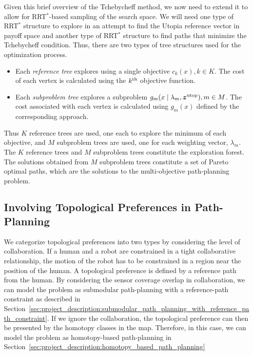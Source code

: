 \documentclass[phd]{byuprop}
\begin{document}
Given this brief overview of the Tchebycheff method, we now need to extend it to allow for RRT$^{*}$-based sampling of the search space.  
We will need one type of RRT$^{*}$ structure to explore in an attempt to find the Utopia reference vector in payoff space and another type of RRT$^{*}$ structure to find paths that minimize the Tchebycheff condition. %
Thus, there are two types of tree structures used for the optimization process.
\begin{itemize}
	\item Each \emph{reference tree} explores using a single objective $ c_{k} (x), k \in K $. 
	The cost of each vertex is calculated using the $ k^{\rm th} $ objective function.
	\item Each \emph{subproblem tree} explores a subproblem $ g_{m} ( x \mid \lambda_{m} , \bm{z}^{\rm utop} ) , m \in M $.
	The cost associated with each vertex is calculated using $ g_{m}(x) $ defined by the corresponding approach.
\end{itemize}
Thus $ K $ reference trees are used, one each to explore the minimum of each objective, and $ M $ subproblem trees are used, one for each weighting vector, $ \lambda_{m} $.  
The $K$ reference trees and $M$ subproblem trees constitute the exploration forest.
The solutions obtained from $ M $ subproblem trees constitute a set of Pareto optimal paths, which are the solutions to the multi-objective path-planning problem. 

\subsection{Involving Topological Preferences in Path-Planning}
\label{sec:project_description:involving_topological_preferences_in_path_planning}

We categorize topological preferences into two types by considering the level of collaboration.
If a human and a robot are constrained in a tight collaborative relationship, the motion of the robot has to be constrained in a region near the position of the human.
A topological preference is defined by a reference path from the human.
By considering the sensor coverage overlap in collaboration, we can model the problem as submodular path-planning with a reference-path constraint as described in Section~\ref{sec:project_description:submodular_path_planning_with_reference_path_constraint}.
If we ignore the collaboration, the topological preference can then be presented by the homotopy classes in the map.
Therefore, in this case, we can model the problem as homotopy-based path-planning in Section~\ref{sec:project_description:homotopy_based_path_planning} 
\end{document}
